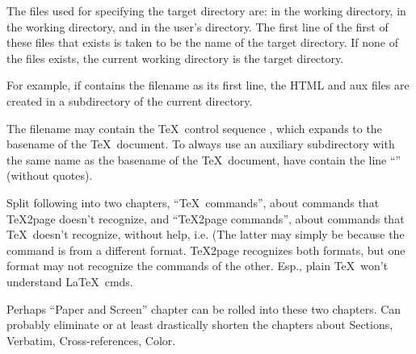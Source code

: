 The files used for specifying the target directory are:
 in the working directory,
 in the working directory, and
 in the user’s  directory.
The first line of the first of these files that exists
is taken to be the name of the target directory.
If none of the files exists, the current working
directory is the target directory.

For example, if  contains the filename
 as its first line, the HTML and aux files are
created in a subdirectory  of the
current directory.


The filename may contain the \TeX\ control sequence
\p{\jobname}, which expands to the basename of
the \TeX\ document.  To always use an auxiliary
subdirectory with the same name as the basename of the
\TeX\ document, have  contain the
line “\p{\jobname}” (without quotes).

\iffalse
beginsection Info files

If a \TeX2page-generated set of HTML files is largely text, it can be
read using text-based browsers such as Lynx~\cite{lynx}.  However, many
people would rather view it as an Info~\cite{texinfo} document. Info files can be
browsed very rapidly in a text editor or a lightweight console browser;
allow convenient regex search across the entire document; and can
be read as plain text as they have much less markup than the
corresponding HTML.

The \TeX2page distribution includes a script \p{t2p2info} for converting
\TeX2page-generated HTML into Info.  \p{t2p2info} takes as argument the
filename of the main HTML file generated by \TeX2page, e.g.,

\p{
t2p2info jobname.html
}
The result is one or more Info files, the first of them named
\p{jobname.info}.
\fi

\iffalse
Split following into two chapters, “\TeX\ commands”, about
commands that \TeX2page doesn’t recognize,
and
“\TeX2page commands”, about commands that \TeX\ doesn’t
recognize, without help, i.e.  (The latter may simply be
because the command is from a different format.  \TeX2page
recognizes both formats, but one format may not recognize
the commands of the other.  Esp., plain \TeX\ won’t understand
\LaTeX\ cmds.

Perhaps “Paper and Screen” chapter can be rolled into these
two chapters.  Can probably eliminate or at least
drastically shorten the chapters about
Sections, Verbatim, Cross-references, Color.

